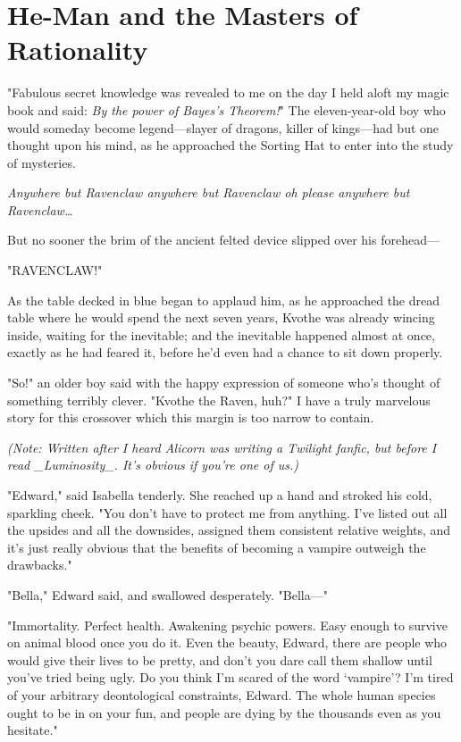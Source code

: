 \section{He-Man and the Masters of Rationality}

"Fabulous secret knowledge was revealed to me on the day I held aloft my magic
book and said: \emph{By the power of Bayes's Theorem!}"
\sbreak
The eleven-year-old boy who would someday become legend---slayer of dragons,
killer of kings---had but one thought upon his mind, as he approached the
Sorting Hat to enter into the study of mysteries.

\emph{Anywhere but Ravenclaw anywhere but Ravenclaw oh please anywhere but
Ravenclaw{\ldots}}

But no sooner the brim of the ancient felted device slipped over his forehead---

"RAVENCLAW!"

As the table decked in blue began to applaud him, as he approached the dread
table where he would spend the next seven years, Kvothe was already wincing
inside, waiting for the inevitable; and the inevitable happened almost at once,
exactly as he had feared it, before he'd even had a chance to sit down properly.

"So!" an older boy said with the happy expression of someone who's thought of
something terribly clever. "Kvothe the Raven, huh?"
\sbreak
I have a truly marvelous story for this crossover which this margin is too
narrow to contain.

\emph{(Note: Written after I heard Alicorn was writing a Twilight fanfic, but
before I read \_Luminosity\_. It's obvious if you're one of us.)}

\noindent{}"Edward," said Isabella tenderly. She reached up a hand and stroked his cold,
sparkling cheek. "You don't have to protect me from anything. I've listed out
all the upsides and all the downsides, assigned them consistent relative
weights, and it's just really obvious that the benefits of becoming a vampire
outweigh the drawbacks."

"Bella," Edward said, and swallowed desperately. "Bella---"

"Immortality. Perfect health. Awakening psychic powers. Easy enough to survive
on animal blood once you do it. Even the beauty, Edward, there are people who
would give their lives to be pretty, and don't you dare call them shallow until
you've tried being ugly. Do you think I'm scared of the word `vampire'? I'm
tired of your arbitrary deontological constraints, Edward. The whole human
species ought to be in on your fun, and people are dying by the thousands even
as you hesitate."

